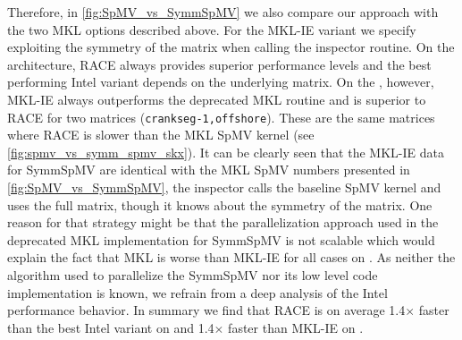 Therefore,  in \cref{fig:SpMV_vs_SymmSpMV} we also compare  our approach with the two \acrshort{MKL} options described above. For the MKL-IE variant we specify exploiting the symmetry of the matrix when calling the inspector routine. 
On the \IVB architecture, \acrshort{RACE} always provides superior performance levels and the best performing Intel variant depends on the underlying matrix. On the \SKX, however, MKL-IE always outperforms the deprecated MKL routine and is superior to \acrshort{RACE} for two matrices (\texttt{crankseg-1,offshore}). These are the same matrices where \acrshort{RACE} is slower than the MKL \acrshort{SpMV} kernel (see \cref{fig:spmv_vs_symm_spmv_skx}). It can be clearly seen that the MKL-IE data for \acrshort{SymmSpMV} 
 are identical with the MKL \acrshort{SpMV} numbers presented in \cref{fig:SpMV_vs_SymmSpMV}, \ie the inspector calls the baseline \acrshort{SpMV} kernel and uses the full matrix, though it knows about the symmetry of the matrix. One reason for that strategy might be that the parallelization approach used in the deprecated MKL implementation for \acrshort{SymmSpMV} is not scalable which would explain the fact that MKL is worse than MKL-IE for all cases on \SKX.  As neither the algorithm used to parallelize the \acrshort{SymmSpMV} nor its low level code implementation is known, we refrain from a deep analysis of the Intel performance behavior. 
In summary we find that \acrshort{RACE} is on average 1.4$\times$ faster than the best Intel variant on \IVB and  1.4$\times$ faster than MKL-IE on \SKX.
